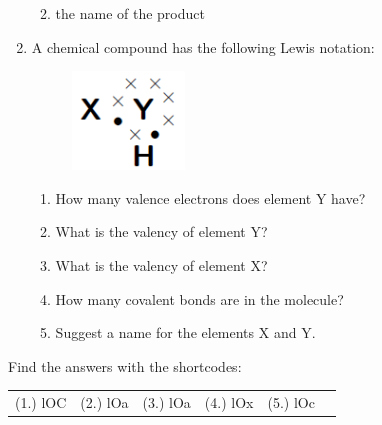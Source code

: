 \begin{enumerate}[noitemsep, label=\textbf{\arabic*}. ]
\begin{enumerate}[noitemsep, label=\textbf{\alph*}. ]
\label{m38701*uid37}\item the name of the product
\end{enumerate}
                \label{m38701*uid38}\item A chemical compound has the following Lewis notation:
    \setcounter{subfigure}{0}
	\begin{figure}[H] %
    \begin{center}
    \label{m38701*id141174!!!underscore!!!media}\label{m38701*id141174!!!underscore!!!printimage}\includegraphics[width=3cm]{col11305.imgs/m38701_CG11C1_018.png} %
      \vspace{2pt}
    \vspace{.1in}
    \end{center}
 \end{figure}       \label{m38701*id141181}\begin{enumerate}[noitemsep, label=\textbf{\alph*}. ] 
            \label{m38701*uid39}\item How many valence electrons does element $\mathrm{Y}$ have?
\label{m38701*uid40}\item What is the valency of element $\mathrm{Y}$?
\label{m38701*uid41}\item What is the valency of element $\mathrm{X}$?
\label{m38701*uid42}\item How many covalent bonds are in the molecule?
\label{m38701*uid43}\item Suggest a name for the elements $\mathrm{X}$ and $\mathrm{Y}$.
\end{enumerate}
                \end{enumerate}
  \label{m38701**end}
\par {} Find the answers with the shortcodes:
 \par \begin{tabular}[h]{cccccc}
 (1.) lOC  &  (2.) lOa  &  (3.) lOa  &  (4.) lOx  &  (5.) lOc  & \end{tabular}
